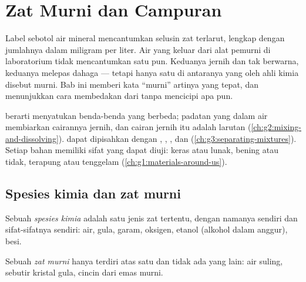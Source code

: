 \chapter{Zat Murni dan Campuran}\label{ch:g6:pure-substances-and-mixtures}

Label sebotol air mineral mencantumkan selusin zat terlarut, lengkap
dengan jumlahnya dalam miligram per liter. Air yang keluar dari alat
pemurni di laboratorium tidak mencantumkan satu pun. Keduanya jernih dan
tak berwarna, keduanya melepas dahaga --- tetapi hanya satu di antaranya
yang oleh ahli kimia disebut murni. Bab ini memberi kata ``murni''
artinya yang tepat, dan menunjukkan cara membedakan  dari
 tanpa mencicipi apa pun.

\begin{recall}
 berarti menyatukan benda-benda yang berbeda; padatan yang
 dalam air membiarkan cairannya jernih, dan cairan jernih itu
adalah larutan (\cref{ch:g2:mixing-and-dissolving}).  dapat
dipisahkan dengan , , , dan 
(\cref{ch:g3:separating-mixtures}). Setiap bahan memiliki sifat yang
dapat diuji: keras atau lunak, bening atau tidak, terapung atau
tenggelam (\cref{ch:g1:materials-around-us}).
\end{recall}

\section{Spesies kimia dan zat murni}

\begin{definition}\label{def:g6:pure-substances-and-mixtures:species}
Sebuah \emph{spesies kimia} adalah satu jenis zat
tertentu, dengan namanya sendiri dan sifat-sifatnya sendiri: air, gula,
garam, oksigen, etanol (alkohol dalam anggur), besi.
\end{definition}

\begin{definition}\label{def:g6:pure-substances-and-mixtures:pure-substance}
Sebuah \emph{zat murni} hanya terdiri atas satu  dan tidak ada yang lain: air suling, sebutir kristal gula, cincin
dari emas murni.
\end{definition}


